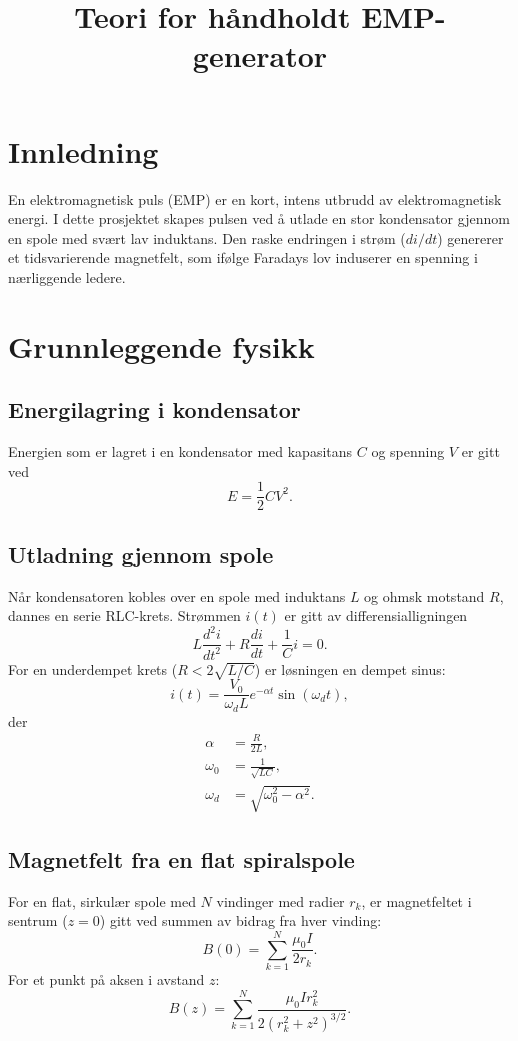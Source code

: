 \documentclass{article}
\title{Teori for håndholdt EMP-generator}
\author{}
\date{}
\begin{document}
\maketitle

\section{Innledning}
En elektromagnetisk puls (EMP) er en kort, intens utbrudd av elektromagnetisk energi. I dette prosjektet skapes pulsen ved å utlade en stor kondensator gjennom en spole med svært lav induktans. Den raske endringen i strøm ($di/dt$) genererer et tidsvarierende magnetfelt, som ifølge Faradays lov induserer en spenning i nærliggende ledere.

\section{Grunnleggende fysikk}

\subsection{Energilagring i kondensator}
Energien som er lagret i en kondensator med kapasitans $C$ og spenning $V$ er gitt ved
\begin{equation}
E = \frac{1}{2} C V^2.
\end{equation}

\subsection{Utladning gjennom spole}
Når kondensatoren kobles over en spole med induktans $L$ og ohmsk motstand $R$, dannes en serie RLC-krets. Strømmen $i(t)$ er gitt av differensialligningen
\begin{equation}
L \frac{d^2 i}{dt^2} + R \frac{di}{dt} + \frac{1}{C} i = 0.
\end{equation}
For en underdempet krets ($R < 2\sqrt{L/C}$) er løsningen en dempet sinus:
\begin{equation}
i(t) = \frac{V_0}{\omega_d L} e^{-\alpha t} \sin(\omega_d t),
\end{equation}
der
\begin{align}
\alpha &= \frac{R}{2L}, \\
\omega_0 &= \frac{1}{\sqrt{LC}}, \\
\omega_d &= \sqrt{\omega_0^2 - \alpha^2}.
\end{align}

\subsection{Magnetfelt fra en flat spiralspole}
For en flat, sirkulær spole med $N$ vindinger med radier $r_k$, er magnetfeltet i sentrum ($z=0$) gitt ved summen av bidrag fra hver vinding:
\begin{equation}
B(0) = \sum_{k=1}^{N} \frac{\mu_0 I}{2 r_k}.
\end{equation}
For et punkt på aksen i avstand $z$:
\begin{equation}
B(z) = \sum_{k=1}^{N} \frac{\mu_0 I r_k^2}{2 (r_k^2 + z^2)^{3/2}}.
\end{equation}
\end{document}
